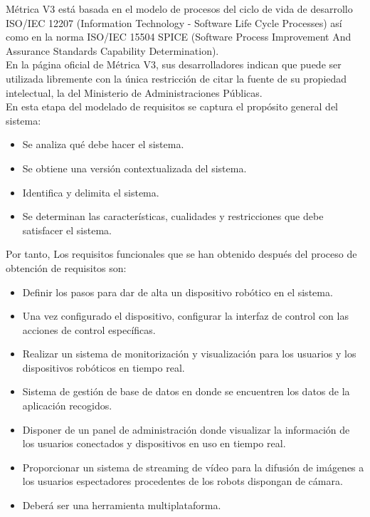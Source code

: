 Métrica V3 \cite{website:metrica} está basada en el modelo de procesos del ciclo de vida de desarrollo ISO/IEC 12207 (Information Technology - Software Life Cycle Processes) así como
en la norma ISO/IEC 15504 SPICE (Software Process Improvement And Assurance Standards Capability Determination).\\

En la página oficial de Métrica V3, sus desarrolladores indican que puede ser utilizada libremente con la única restricción de citar la fuente de su propiedad intelectual, 
la del Ministerio de Administraciones Públicas.\\

En esta etapa del modelado de requisitos se captura el propósito general del sistema:

\begin{itemize}
  \item Se analiza qué debe hacer el sistema.
  \item Se obtiene una versión contextualizada del sistema.
  \item Identifica y delimita el sistema.
  \item Se determinan las características, cualidades y restricciones que debe satisfacer el sistema.
\end{itemize}


Por tanto, Los requisitos funcionales que se han obtenido después del proceso de obtención de requisitos son:\\

\begin{itemize}
  \item Definir los pasos para dar de alta un dispositivo robótico en el sistema.
  \item Una vez configurado el dispositivo, configurar la interfaz de control con las acciones de control específicas.
  \item Realizar un sistema de monitorización y visualización para los usuarios y los dispositivos robóticos en tiempo real.
  \item Sistema de gestión de base de datos en donde se encuentren los datos de la aplicación recogidos.
  \item Disponer de un panel de administración donde visualizar la información de los usuarios conectados y dispositivos en uso en tiempo real. 
  \item Proporcionar un sistema de streaming de vídeo para la difusión de imágenes a los usuarios espectadores procedentes de los robots dispongan de cámara.
  \item Deberá ser una herramienta multiplataforma.  
\end{itemize}



